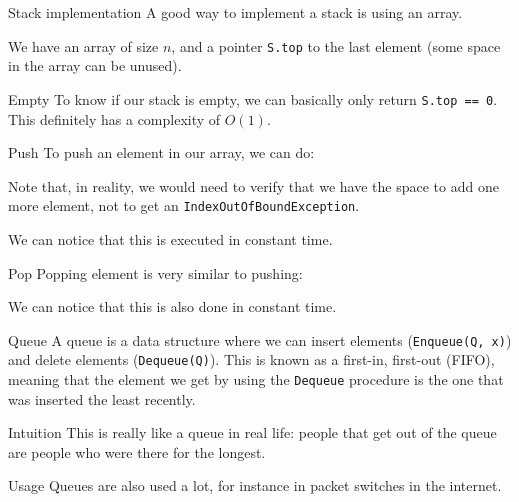\documentclass[a4paper]{article}
\begin{document}
\begin{parag}{Stack implementation}
    A good way to implement a stack is using an array.

    We have an array of size $n$, and a pointer \texttt{S.top} to the last element (some space in the array can be unused).

    \begin{subparag}{Empty}
        To know if our stack is empty, we can basically only return \texttt{S.top == 0}. This definitely has a complexity of $O\left(1\right)$.
    \end{subparag}
    
    \begin{subparag}{Push}
        To push an element in our array, we can do:

        Note that, in reality, we would need to verify that we have the space to add one more element, not to get an \texttt{IndexOutOfBoundException}.
        
        We can notice that this is executed in constant time.
    \end{subparag}

    \begin{subparag}{Pop}
        Popping element is very similar to pushing:

        We can notice that this is also done in constant time.
    \end{subparag}
\end{parag}

\begin{parag}{Queue}
    A queue is a data structure where we can insert elements (\texttt{Enqueue(Q, x)}) and delete elements (\texttt{Dequeue(Q)}). This is known as a first-in, first-out (FIFO), meaning that the element we get by using the \texttt{Dequeue} procedure is the one that was inserted the least recently.

    \begin{subparag}{Intuition}
        This is really like a queue in real life: people that get out of the queue are people who were there for the longest.
    \end{subparag}

    \begin{subparag}{Usage}
        Queues are also used a lot, for instance in packet switches in the internet.
    \end{subparag}
\end{parag}
\end{document}
